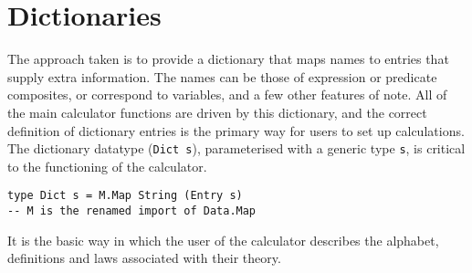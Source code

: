 \section{Dictionaries}\label{sec:Dictionaries}

The approach taken is to provide a dictionary that maps names
to entries that supply extra information.
The names can be those of expression or predicate composites,
or correspond to variables, and a few other features of note.
All of the main calculator functions are driven by this
dictionary,
and the correct definition of dictionary entries
is the primary way for users to set up calculations.
The dictionary datatype (\texttt{Dict s}),
parameterised with a generic type \texttt{s},
is critical to the functioning of the calculator.
\begin{verbatim}
type Dict s = M.Map String (Entry s)
-- M is the renamed import of Data.Map
\end{verbatim}
It is the basic way in which the user of the calculator
describes the alphabet, definitions and laws associated with their theory.

